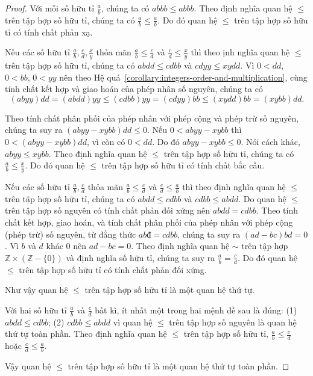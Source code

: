 \begin{proof}
	Với mỗi số hữu tỉ $\frac{a}{b}$, chúng ta có $abbb\leq abbb$. Theo định nghĩa quan hệ $\leq$ trên tập hợp số hữu tỉ, chúng ta có $\frac{a}{b}\leq\frac{a}{b}$. Do đó quan hệ $\leq$ trên tập hợp số hữu tỉ có tính chất phản xạ.

	Nếu các số hữu tỉ $\frac{a}{b}, \frac{c}{d}, \frac{x}{y}$ thỏa mãn $\frac{a}{b}\leq \frac{c}{d}$ và $\frac{c}{d}\leq\frac{x}{y}$ thì theo ịnh nghĩa quan hệ $\leq$ trên tập hợp số hữu tỉ, chúng ta có $abdd \leq cdbb$ và $cdyy \leq xydd$. Vì $0 < dd$, $0 < bb$, $0 < yy$ nên theo Hệ quả~\ref{corollary:integers-order-and-multiplication}, cùng tính chất kết hợp và giao hoán của phép nhân số nguyên, chúng ta có
	\[
		(abyy)dd = (abdd)yy \leq (cdbb)yy = (cdyy)bb \leq (xydd)bb = (xybb)dd.
	\]

	Theo tính chất phân phối của phép nhân với phép cộng và phép trừ số nguyên, chúng ta suy ra $(abyy - xybb)dd\leq 0$. Nếu $0 < abyy - xybb$ thì $0 < (abyy - xybb)dd$, vì còn có $0 < dd$. Do đó $abyy - xybb \leq 0$. Nói cách khác, $abyy\leq xybb$. Theo định nghĩa quan hệ $\leq$ trên tập hợp số hữu tỉ, chúng ta có $\frac{a}{b}\leq \frac{x}{y}$. Do đó quan hệ $\leq$ trên tập hợp số hữu tỉ có tính chất bắc cầu.

	Nếu các số hữu tỉ $\frac{a}{b}, \frac{c}{d}$ thỏa mãn $\frac{a}{b}\leq \frac{c}{d}$ và $\frac{c}{d}\leq\frac{a}{b}$ thì theo định nghĩa quan hệ $\leq$ trên tập hợp số hữu tỉ, chúng ta có $abdd\leq cdbb$ và $cdbb\leq abdd$. Do quan hệ $\leq$ trên tập hợp số nguyên có tính chất phản đối xứng nên $abdd = cdbb$. Theo tính chất kết hợp, giao hoán, và tính chất phân phối của phép nhân với phép cộng (phép trừ) số nguyên, từ đẳng thức $abđ = cdbb$, chúng ta suy ra $(ad - bc)bd = 0$. Vì $b$ và $d$ khác $0$ nên $ad - bc = 0$. Theo định nghĩa quan hệ $\sim$ trên tập hợp $\mathbb{Z}\times(\mathbb{Z} - \{0\})$ và định nghĩa số hữu tỉ, chúng ta suy ra $\frac{a}{b} = \frac{c}{d}$. Do đó quan hệ $\leq$ trên tập hợp số hữu tỉ có tính chất phản đối xứng.

	Như vậy quan hệ $\leq$ trên tập hợp số hữu tỉ là một quan hệ thứ tự.

	Với hai số hữu tỉ $\frac{a}{b}$ và $\frac{c}{d}$ bất kì, ít nhất một trong hai mệnh đề sau là đúng: (1) $abdd \leq cdbb$; (2) $cdbb \leq abdd$ vì quan hệ $\leq$ trên tập hợp số nguyên là quan hệ thứ tự toàn phần. Theo định nghĩa quan hệ $\leq$ trên tập hợp số hữu tỉ, $\frac{a}{b}\leq\frac{c}{d}$ hoặc $\frac{c}{d}\leq\frac{a}{b}$.

	Vậy quan hệ $\leq$ trên tập hợp số hữu tỉ là một quan hệ thứ tự toàn phần.
\end{proof}

